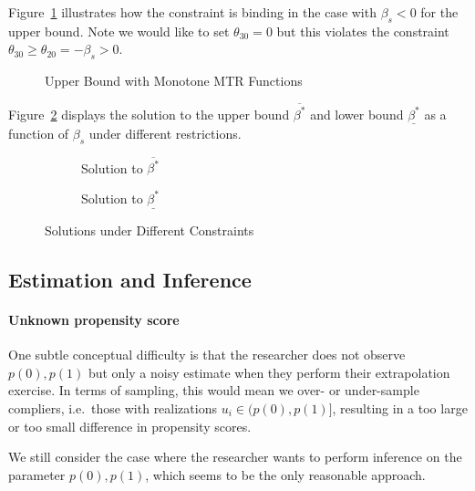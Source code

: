 \documentclass[11pt,a4paper,english]{article} %
\numberwithin{equation}{section}
\numberwithin{figure}{section}
\numberwithin{table}{section}
\theoremstyle{definition}
\theoremstyle{remark}
\begin{document}
Figure~\ref{fig:sm_upper_incr.tex} illustrates how the constraint is binding in the case with $\beta_s < 0$ for the upper bound.
Note we would like to set $\theta_{30} = 0$ but this violates the constraint $\theta_{30} \geq \theta_{20} = -\beta_s > 0$.

\begin{figure}
	
	\caption{Upper Bound with Monotone MTR Functions}\label{fig:sm_upper_incr.tex}
\end{figure}

Figure~\ref{fig:sm_sol_upper} displays the solution to the upper bound $\overline{\beta^*}$ and lower bound $\underline{\beta^*}$ as a function of $\beta_s$ under different restrictions.
\begin{figure}
	\centering
	\begin{subfigure}{0.45\textwidth}
		\centering
		
		\caption{Solution to $\overline{\beta^*}$}
	\end{subfigure}
	\hfill
	\begin{subfigure}{0.45\textwidth}
		\centering
		
		\caption{Solution to $\underline{\beta^*}$}
	\end{subfigure}
	\caption{Solutions under Different Constraints}\label{fig:sm_sol_upper}
\end{figure}

\subsection{Estimation and Inference}
\paragraph{Unknown propensity score}
One subtle conceptual difficulty is that the researcher does not observe $p(0), p(1)$ but only a noisy estimate when they perform their extrapolation exercise. In terms of sampling, this would mean we over- or under-sample compliers, i.e.\ those with realizations $u_i\in (p(0), p(1)]$, resulting in a too large or too small difference in propensity scores.

We still consider the case where the researcher wants to perform inference on the parameter $p(0), p(1)$, which seems to be the only reasonable approach.
\end{document}
